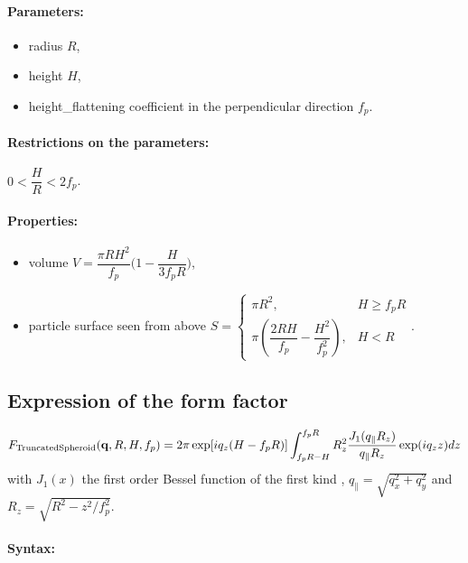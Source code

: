\paragraph{Parameters:}
\begin{itemize}
\item radius $R$,
\item height $H$,
\item height\_flattening coefficient in the perpendicular direction $f_p$.
\end{itemize}

\paragraph{Restrictions on the parameters:} $0< \dfrac{H}{R}< 2f_p$.

\paragraph{Properties:}
\begin{itemize}
\item volume $V = \dfrac{\pi R H^2}{f_p}  \Big(1-\dfrac{H}{3f_p R}\Big)$,
\item particle surface seen from above $S = \left\{\begin{array}{ll} \pi R^2, & H \geq f_pR \\
         \pi\left(\dfrac{2RH}{f_p}-\dfrac{H^2}{f_p^2}\right), & H < R \end{array}\right.$.
\end{itemize}

\subsection{Expression of the form factor}
\begin{equation*} 
F_{\rm{TruncatedSpheroid}}(\mathbf{q},R, H,f_p) =   2\pi \exp[iq_z(H-f_pR)] \int_{f_p R-H} ^{f_p R} R_z
        ^2\frac{J_1(q_{\parallel}R_z)}{q_{\parallel}R_z} \exp(i q_z z) dz
\end{equation*}
with $J_1(x)$ the first order
Bessel function of the first kind \cite{AbSt64}, $q_{\parallel}=\sqrt{q_x^2+q_y^2} $ and $R_z=\sqrt{R^2-z^2/f_p^2}$.

\paragraph{Syntax:} 

